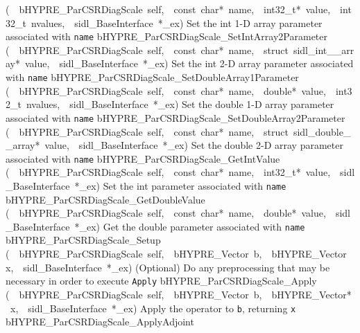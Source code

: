 \documentclass{article}
\begin{document}
\begin{cxxentry}
\begin{cxxentry}
\begin{cxxnames}
        {(\ \ bHYPRE\_ParCSRDiagScale\ self,\ \ const\ char*\ name,\ \ int32\_t*\ value,\ \ int32\_t\ nvalues,\ \ sidl\_BaseInterface\ *\_ex)}
        {
Set the int 1-D array parameter associated with {\tt name}}
        {}
\label{cxx.6.1.20}
        {bHYPRE\_ParCSRDiagScale\_SetIntArray2Parameter}
        {(\ \ bHYPRE\_ParCSRDiagScale\ self,\ \ const\ char*\ name,\ \ struct\ sidl\_int\_\_array*\ value,\ \ sidl\_BaseInterface\ *\_ex)}
        {
Set the int 2-D array parameter associated with {\tt name}}
        {}
\label{cxx.6.1.21}
        {bHYPRE\_ParCSRDiagScale\_SetDoubleArray1Parameter}
        {(\ \ bHYPRE\_ParCSRDiagScale\ self,\ \ const\ char*\ name,\ \ double*\ value,\ \ int32\_t\ nvalues,\ \ sidl\_BaseInterface\ *\_ex)}
        {
Set the double 1-D array parameter associated with {\tt name}}
        {}
\label{cxx.6.1.22}
        {bHYPRE\_ParCSRDiagScale\_SetDoubleArray2Parameter}
        {(\ \ bHYPRE\_ParCSRDiagScale\ self,\ \ const\ char*\ name,\ \ struct\ sidl\_double\_\_array*\ value,\ \ sidl\_BaseInterface\ *\_ex)}
        {
Set the double 2-D array parameter associated with {\tt name}}
        {}
\label{cxx.6.1.23}
        {bHYPRE\_ParCSRDiagScale\_GetIntValue}
        {(\ \ bHYPRE\_ParCSRDiagScale\ self,\ \ const\ char*\ name,\ \ int32\_t*\ value,\ \ sidl\_BaseInterface\ *\_ex)}
        {
Set the int parameter associated with {\tt name}}
        {}
\label{cxx.6.1.24}
        {bHYPRE\_ParCSRDiagScale\_GetDoubleValue}
        {(\ \ bHYPRE\_ParCSRDiagScale\ self,\ \ const\ char*\ name,\ \ double*\ value,\ \ sidl\_BaseInterface\ *\_ex)}
        {
Get the double parameter associated with {\tt name}}
        {}
\label{cxx.6.1.25}
        {bHYPRE\_ParCSRDiagScale\_Setup}
        {(\ \ bHYPRE\_ParCSRDiagScale\ self,\ \ bHYPRE\_Vector\ b,\ \ bHYPRE\_Vector\ x,\ \ sidl\_BaseInterface\ *\_ex)}
        {
(Optional) Do any preprocessing that may be necessary in
order to execute {\tt Apply}}
        {}
\label{cxx.6.1.26}
        {bHYPRE\_ParCSRDiagScale\_Apply}
        {(\ \ bHYPRE\_ParCSRDiagScale\ self,\ \ bHYPRE\_Vector\ b,\ \ bHYPRE\_Vector*\ x,\ \ sidl\_BaseInterface\ *\_ex)}
        {
Apply the operator to {\tt b}, returning {\tt x}}
        {}
\label{cxx.6.1.27}
        {bHYPRE\_ParCSRDiagScale\_ApplyAdjoint}

\end{cxxnames}
\end{cxxentry}
\end{cxxentry}
\end{document}
